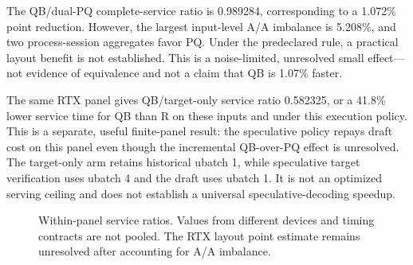 The QB/dual-PQ complete-service ratio is 0.989284, corresponding to a 1.072\% point reduction. However, the largest input-level A/A imbalance is 5.208\%, and two process-session aggregates favor PQ. Under the predeclared rule, a practical layout benefit is not established. This is a noise-limited, unresolved small effect—not evidence of equivalence and not a claim that QB is 1.07\% faster.

The same RTX panel gives QB/target-only service ratio 0.582325, or a 41.8\% lower service time for QB than R on these inputs and under this execution policy. This is a separate, useful finite-panel result: the speculative policy repays draft cost on this panel even though the incremental QB-over-PQ effect is unresolved. The target-only arm retains historical ubatch 1, while speculative target verification uses ubatch 4 and the draft uses ubatch 1. It is not an optimized serving ceiling and does not establish a universal speculative-decoding speedup.

\begin{figure}[t]
\centering

\caption{Within-panel service ratios. Values from different devices and timing contracts are not pooled. The RTX layout point estimate remains unresolved after accounting for A/A imbalance.}
\label{fig:cost}
\end{figure}
